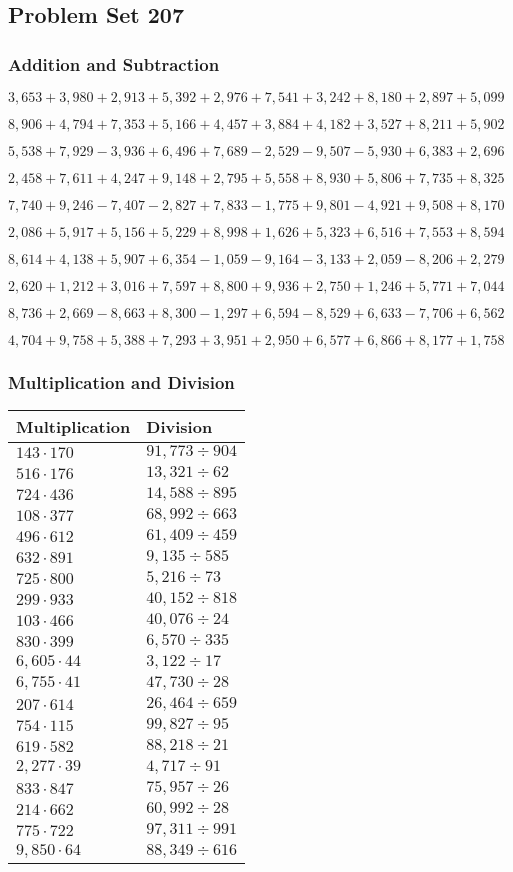 \hypertarget{problem-set-207}{%
\subsection{Problem Set 207}\label{problem-set-207}}

\hypertarget{addition-and-subtraction}{%
\subsubsection{Addition and
Subtraction}\label{addition-and-subtraction}}

\(3,653+3,980+2,913+5,392+2,976+7,541+3,242+8,180+2,897+5,099\)

\(8,906+4,794+7,353+5,166+4,457+3,884+4,182+3,527+8,211+5,902\)

\(5,538+7,929-3,936+6,496+7,689-2,529-9,507-5,930+6,383+2,696\)

\(2,458+7,611+4,247+9,148+2,795+5,558+8,930+5,806+7,735+8,325\)

\(7,740+9,246-7,407-2,827+7,833-1,775+9,801-4,921+9,508+8,170\)

\(2,086+5,917+5,156+5,229+8,998+1,626+5,323+6,516+7,553+8,594\)

\(8,614+4,138+5,907+6,354-1,059-9,164-3,133+2,059-8,206+2,279\)

\(2,620+1,212+3,016+7,597+8,800+9,936+2,750+1,246+5,771+7,044\)

\(8,736+2,669-8,663+8,300-1,297+6,594-8,529+6,633-7,706+6,562\)

\(4,704+9,758+5,388+7,293+3,951+2,950+6,577+6,866+8,177+1,758\)

\hypertarget{multiplication-and-division}{%
\subsubsection{Multiplication and
Division}\label{multiplication-and-division}}

\begin{longtable}[]{@{}ll@{}}
\toprule
Multiplication & Division\tabularnewline
\midrule
\endhead
\(143\cdot170\) & \(91,773÷904\)\tabularnewline
\(516\cdot176\) & \(13,321÷62\)\tabularnewline
\(724\cdot436\) & \(14,588÷895\)\tabularnewline
\(108\cdot377\) & \(68,992÷663\)\tabularnewline
\(496\cdot612\) & \(61,409÷459\)\tabularnewline
\(632\cdot891\) & \(9,135÷585\)\tabularnewline
\(725\cdot800\) & \(5,216÷73\)\tabularnewline
\(299\cdot933\) & \(40,152÷818\)\tabularnewline
\(103\cdot466\) & \(40,076÷24\)\tabularnewline
\(830\cdot399\) & \(6,570÷335\)\tabularnewline
\(6,605\cdot44\) & \(3,122÷17\)\tabularnewline
\(6,755\cdot41\) & \(47,730÷28\)\tabularnewline
\(207\cdot614\) & \(26,464÷659\)\tabularnewline
\(754\cdot115\) & \(99,827÷95\)\tabularnewline
\(619\cdot582\) & \(88,218÷21\)\tabularnewline
\(2,277\cdot39\) & \(4,717÷91\)\tabularnewline
\(833\cdot847\) & \(75,957÷26\)\tabularnewline
\(214\cdot662\) & \(60,992÷28\)\tabularnewline
\(775\cdot722\) & \(97,311÷991\)\tabularnewline
\(9,850\cdot64\) & \(88,349÷616\)\tabularnewline
\bottomrule
\end{longtable}

